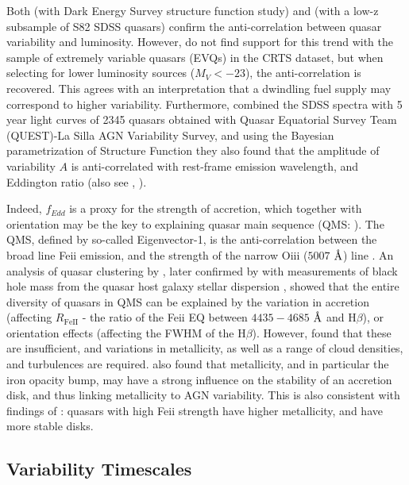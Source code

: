 \documentclass[twocolumn]{aastex62}
\let\oldAA\AA
\renewcommand{\AA}{\text{\normalfont\oldAA}}
\begin{document}
Both \citet{rumbaugh2018} (with Dark Energy Survey structure function study) and  \citet{sun2018}  (with a low-z subsample of S82 SDSS quasars) confirm the anti-correlation between quasar variability and luminosity. However, \citet{graham2019} do not find support for this trend with the sample of extremely variable quasars (EVQs) in the CRTS dataset,  but when selecting for lower luminosity sources ($M_{V} < -23$), the anti-correlation is recovered. This agrees with an interpretation that a dwindling fuel supply may correspond to higher variability. Furthermore, \citet{sanchez2018} combined the SDSS spectra with 5 year light curves of 2345 quasars obtained with Quasar Equatorial Survey Team (QUEST)-La Silla AGN Variability Survey, and  using the Bayesian parametrization of Structure Function \citep{schmidt2010} they also found that the amplitude of variability $A$ is anti-correlated with rest-frame emission wavelength,  and Eddington ratio (also see \citealt{simm2016}, \citealt{rakshit2017}).

Indeed, $f_{Edd}$ is a proxy for the strength of accretion, which together with orientation may be the key to explaining quasar main sequence (QMS: \citealt{shen2014, marziani2018}). The QMS, defined by so-called Eigenvector-1, is the anti-correlation between the broad line Fe{\sc ii} emission, and the strength of the narrow O{\sc iii} ($5007$ $\mbox{\AA}$) line \citep{wang1996}. An analysis of quasar clustering by \citet{shen2014}, later confirmed by \citet{sun2015} with measurements of  black hole mass from the quasar host galaxy stellar dispersion \citep{ferrarese2000, kormendy2013}, showed that the entire diversity of quasars in  QMS can be explained by the variation in accretion (affecting $R_{\mathrm{Fe  II}}$ - the ratio of the  Fe{\sc ii} EQ  between $4435-4685$ $\mbox{\AA}$ and H$\beta$), or orientation effects (affecting the FWHM of the H$\beta$). However, \citet{panda2019a, panda2019b} found that these are insufficient, and variations in metallicity, as well as a range of cloud densities, and turbulences are required.  \cite{jiang2016} also found that metallicity, and in particular the iron opacity bump, may have a strong influence on the stability of an accretion disk, and thus linking metallicity to AGN variability. This is also consistent with findings of \cite{sun2018}: quasars with high  Fe{\sc ii} strength have higher metallicity, and have more stable disks. 


\subsection{Variability Timescales}
\end{document}
